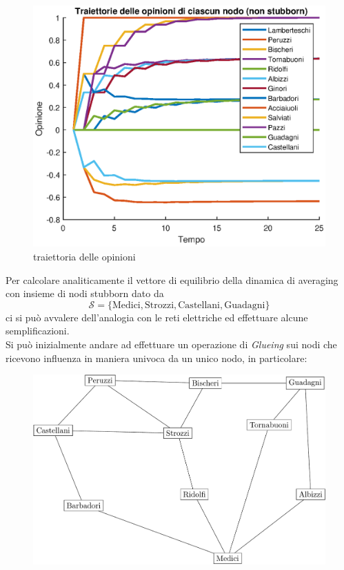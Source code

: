 \documentclass[11pt,largemargins]{homework}
\begin{document}
\begin{alphaparts}
\begin{figure}
    \includegraphics[scale=0.6]{Traiettoria_opinioni.eps}
    \caption{traiettoria delle opinioni}
  \end{figure}
\newpage  
\questionpart

  Per calcolare analiticamente il vettore di equilibrio della dinamica di averaging con insieme di nodi stubborn dato da $$\mathcal{S}=\{\text{Medici}, \text{Strozzi}, \text{Castellani}, \text{Guadagni}\}$$ ci si può avvalere dell'analogia con le reti elettriche ed effettuare alcune semplificazioni.
  \\
  Si può inizialmente andare ad effettuare un operazione di \textit{Glueing} sui nodi che ricevono influenza in maniera univoca da un unico nodo, in particolare:

  \begin{figure}[h]
    \center
     \includegraphics[scale=0.35]{Graph_Glueing.png}
  \end{figure}


\end{alphaparts}
\end{document}
